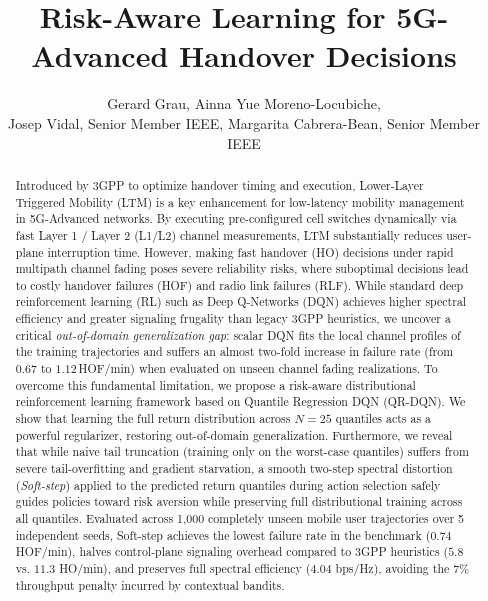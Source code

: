 \documentclass{ieeetmlcn}
\begin{document}
\jvol{--}


\title{Risk-Aware Learning for 5G-Advanced Handover Decisions}

\author{Gerard Grau, Ainna Yue Moreno-Locubiche,\\ Josep Vidal, Senior Member IEEE, Margarita Cabrera-Bean, Senior Member IEEE}


\begin{abstract}
Introduced by 3GPP to optimize handover timing and execution, Lower-Layer Triggered Mobility (LTM) is a key enhancement for low-latency mobility management in 5G-Advanced networks. By executing pre-configured cell switches dynamically via fast Layer 1 / Layer 2 (L1/L2) channel measurements, LTM substantially reduces user-plane interruption time. However, making fast handover (HO) decisions under rapid multipath channel fading poses severe reliability risks, where suboptimal decisions lead to costly handover failures (HOF) and radio link failures (RLF). While standard deep reinforcement learning (RL) such as Deep Q-Networks (DQN) achieves higher spectral efficiency and greater signaling frugality than legacy 3GPP heuristics, we uncover a critical \emph{out-of-domain generalization gap}: scalar DQN fits the local channel profiles of the training trajectories and suffers an almost two-fold increase in failure rate (from $0.67$ to $1.12$\,HOF/min) when evaluated on unseen channel fading realizations. To overcome this fundamental limitation, we propose a risk-aware distributional reinforcement learning framework based on Quantile Regression DQN (QR-DQN). We show that learning the full return distribution across $N=25$ quantiles acts as a powerful regularizer, restoring out-of-domain generalization. Furthermore, we reveal that while naive tail truncation (training only on the worst-case quantiles) suffers from severe tail-overfitting and gradient starvation, a smooth two-step spectral distortion (\emph{Soft-step}) applied to the predicted return quantiles during action selection safely guides policies toward risk aversion while preserving full distributional training across all quantiles. Evaluated across 1,000 completely unseen mobile user trajectories over 5 independent seeds, Soft-step achieves the lowest failure rate in the benchmark ($0.74$ HOF/min), halves control-plane signaling overhead compared to 3GPP heuristics ($5.8$ vs. $11.3$ HO/min), and preserves full spectral efficiency ($4.04$ bps/Hz), avoiding the 7\% throughput penalty incurred by contextual bandits.
\end{abstract}
\end{document}

